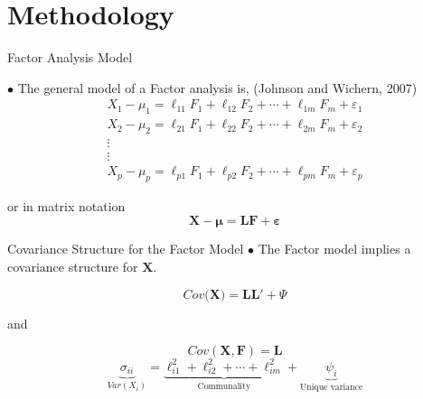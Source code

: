 \documentclass{beamer}
\begin{document}
\section{Methodology}
\begin{frame}{Factor Analysis Model}

$\bullet$ The general model of a Factor analysis is, (Johnson and Wichern, 2007)
\begin{equation}
	\begin{gathered}
		X_1-\mu_1=\ell_{11} F_1+\ell_{12} F_2+\cdots+\ell_{1 m} F_m+\varepsilon_1 \\
		X_2-\mu_2=\ell_{21} F_1+\ell_{22} F_2+\cdots+\ell_{2 m} F_m+\varepsilon_2 \\
		\vdots \\
		\vdots \\
		X_p-\mu_p=\ell_{p 1} F_1+\ell_{p 2} F_2+\cdots+\ell_{p m} F_m+\varepsilon_p
	\end{gathered}
\end{equation}

\vspace{2mm}
	or in matrix notation
	\begin{equation}
		\mathbf{X}- \boldsymbol{\mu}=\mathbf{L}\mathbf{F}+ \boldsymbol{\varepsilon}
	\end{equation}
\end{frame}

\begin{frame}{Covariance Structure for the  Factor Model}
$\bullet$ The Factor model implies a covariance structure for $\mathbf{X}$.
	
	$$Cov(\mathbf{X)=LL'} +\Psi$$ 
	
	and
	
	$$Cov(\mathbf{X,F})= \mathbf{L}$$
\begin{equation}
	\underbrace{\sigma_{ii}}_{Var(X_i)}= \underbrace{\ell_{i1}^2 + \ell_{i2}^2 + \cdots + \ell_{im}^2}_\text{Communality} +\underbrace{\psi_i}_\text{Unique variance}
\end{equation}
\end{frame}
\end{document}
